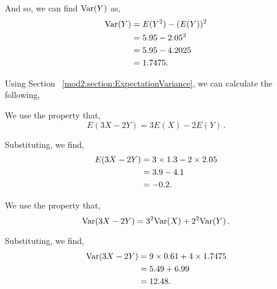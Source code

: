 \begin{subquestions}
\begin{subsubquestions}
\begin{subsubsubquestions}
And so, we can find $\text{Var}(Y)$ as,
\begin{align}
	\text{Var}(Y) & = E(Y^2) - (E(Y))^2 \nonumber \\
	& = 5.95 - 2.05^2 \nonumber \\
	& = 5.95 - 4.2025 \nonumber \\
	& = 1.7475.
\end{align}

\end{subsubsubquestions}


\subsubquestion

Using Section ~\ref{mod2:section:ExpectationVariance}, we can calculate the following,

\begin{subsubsubquestions}
	
\subsubsubquestion
We use the property that,
\begin{equation}
	E(3X - 2Y) = 3E(X) - 2 E(Y) \,.
\end{equation}

Substituting, we find,
\begin{align}
	E(3X-2Y) & = 3 \times 1.3 - 2 \times 2.05 \nonumber \\
	         & = 3.9 - 4.1 \nonumber \\
	         & = -0.2.
\end{align}

\subsubsubquestion
We use the property that,
\begin{equation}
	\text{Var}(3X - 2Y) = 3^2\text{Var}(X) + 2^2 \text{Var}(Y)\,.
\end{equation}

Substituting, we find,
\begin{align}
	\text{Var}(3X-2Y) & = 9 \times 0.61 + 4 \times 1.7475 \nonumber \\
	           & = 5.49 + 6.99 \nonumber \\
	           & = 12.48.
\end{align}

\end{subsubsubquestions}

\end{subsubquestions}

\end{subquestions}

